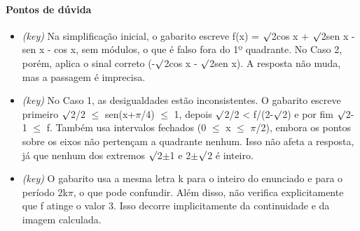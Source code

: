 \documentclass{article}%
\begin{document}
\paragraph{Pontos de dúvida}%
\begin{itemize}%
\item%
\textit{(key)} Na simplificação inicial, o gabarito escreve f(x) = $\surd$2cos x + $\surd$2sen x - sen x - cos x, sem módulos, o que é falso fora do 1º quadrante. No Caso 2, porém, aplica o sinal correto (-$\surd$2cos x - $\surd$2sen x). A resposta não muda, mas a passagem é imprecisa.%
\item%
\textit{(key)} No Caso 1, as desigualdades estão inconsistentes. O gabarito escreve primeiro $\surd$2/2 $\leq$ sen(x+$\pi$/4) $\leq$ 1, depois $\surd$2/2 < f/(2-$\surd$2) e por fim $\surd$2-1 $\leq$ f. Também usa intervalos fechados (0 $\leq$ x $\leq$ $\pi$/2), embora os pontos sobre os eixos não pertençam a quadrante nenhum. Isso não afeta a resposta, já que nenhum dos extremos $\surd$2$\pm$1 e 2$\pm$$\surd$2 é inteiro.%
\item%
\textit{(key)} O gabarito usa a mesma letra k para o inteiro do enunciado e para o período 2k$\pi$, o que pode confundir. Além disso, não verifica explicitamente que f atinge o valor 3. Isso decorre implicitamente da continuidade e da imagem calculada.%
\end{itemize}%
\end{document}
